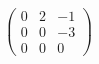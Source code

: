\documentclass[preview]{standalone}
\begin{document}
\begin{align*}
\begin{pmatrix} 0 & 2 & -1 \\ 0 & 0 & -3 \\ 0 & 0 & 0 \end{pmatrix}
\end{align*}
\end{document}
